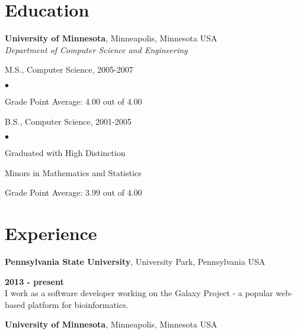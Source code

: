 \documentclass[margin,line]{res}
\newenvironment{list1}{
  \begin{list}{\ding{113}}{%
      \setlength{\itemsep}{0in}
      \setlength{\parsep}{0in} \setlength{\parskip}{0in}
      \setlength{\topsep}{0in} \setlength{\partopsep}{0in} 
      \setlength{\leftmargin}{0.17in}}}{\end{list}}
\newenvironment{list2}{
  \begin{list}{$\bullet$}{%
      \setlength{\itemsep}{0in}
      \setlength{\parsep}{0in} \setlength{\parskip}{0in}
      \setlength{\topsep}{0in} \setlength{\partopsep}{0in} 
      \setlength{\leftmargin}{0.2in}}}{\end{list}}
\begin{document}
\begin{resume}
\section{\sc Education}
{\bf University of Minnesota}, Minneapolis, Minnesota USA\\
{\em Department of Computer Science and Engineering} 
\vspace*{.1in}
\begin{list1}
\item[] M.S., Computer Science, 2005-2007
\begin{list2}
\item Grade Point Average: 4.00 out of 4.00
\end{list2}
\end{list1}
\vspace*{.1in}
\begin{list1}
\item[] B.S., Computer Science,  2001-2005
\begin{list2}
\item Graduated with High Distinction
\item Minors in Mathematics and Statistics
\item Grade Point Average: 3.99 out of 4.00
\end{list2}
\end{list1}


{\section{\sc Experience}}
{\bf Pennsylvania State University}, University Park, Pennsylvania USA

\vspace{-.3cm}\vspace{-.1cm}{\em Research Associate} \hfill {\bf 2013 - present}\\
I work as a software developer working on the Galaxy Project - a popular web-based platform for bioinformatics.

{\bf University of Minnesota}, Minneapolis, Minnesota USA


\end{resume}
\end{document}
